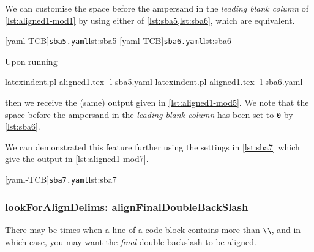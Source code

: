 \documentclass[10pt]{article}
\begin{document}
 \begin{example}
 We can customise the space before the ampersand in the \emph{leading blank column} of
 \cref{lst:aligned1-mod1} by using either of \cref{lst:sba5,lst:sba6}, which are
 equivalent.

 \begin{cmhtcbraster}
  [yaml-TCB]{\texttt{sba5.yaml}}{lst:sba5}
  [yaml-TCB]{\texttt{sba6.yaml}}{lst:sba6}
 \end{cmhtcbraster}

 Upon running

 \begin{commandshell}
latexindent.pl aligned1.tex -l sba5.yaml
latexindent.pl aligned1.tex -l sba6.yaml
\end{commandshell}

 then we receive the (same) output given in \cref{lst:aligned1-mod5}. We note that the
 space before the ampersand in the \emph{leading blank column} has been set to \texttt{0}
 by \cref{lst:sba6}.

 We can demonstrated this feature further using the settings in \cref{lst:sba7} which
 give the output in \cref{lst:aligned1-mod7}.

 \begin{cmhtcbraster}[raster columns=3,
   raster left skip=-3.75cm,
   raster right skip=-2cm,]
  [yaml-TCB]{\texttt{sba7.yaml}}{lst:sba7}
 \end{cmhtcbraster}
 \end{example}

\subsubsection{lookForAlignDelims: alignFinalDoubleBackSlash}
 There may be times when a line of a code block contains more than \lstinline!\\!, and in
 which case, you may want the \emph{final} double backslash to be aligned.
\end{document}
